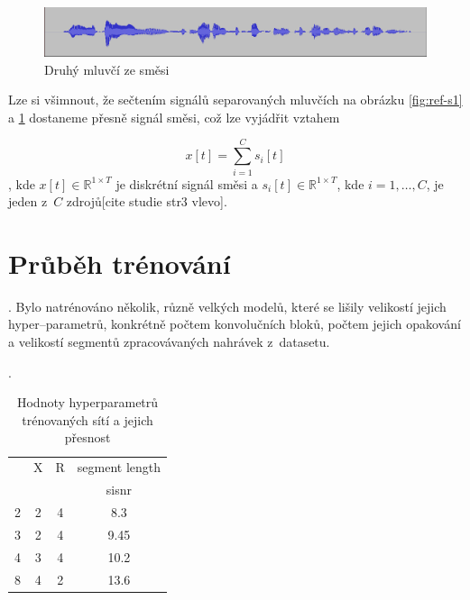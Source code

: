 \begin{figure}[H]
    \centering
    \includegraphics[scale=0.35]{obrazky-figures/dataset-s2.png}
    \caption{\label{fig:ref-s2}Druhý mluvčí ze směsi}
\end{figure}

Lze si všimnout, že sečtením signálů separovaných mluvčích na obrázku \ref{fig:ref-s1} a \ref{fig:ref-s2} dostaneme přesně signál směsi, což lze vyjádřit vztahem

\begin{equation}
  x[t] = \sum_{i=1}^C s_i[t]
\end{equation}
, kde $x[t] \in \mathbb{R}^{1 \times T}$ je diskrétní signál směsi a $s_i[t] \in \mathbb{R}^{1 \times T}$, kde $i = 1,\ldots,C$, je jeden z~$C$ zdrojů[cite studie str3 vlevo]. 





\section{Průběh trénování}
.
Bylo natrénováno několik, různě velkých modelů, které se lišily velikostí jejich hyper--parametrů, konkrétně počtem konvolučních bloků, počtem jejich opakování a velikostí segmentů zpracovávaných nahrávek z~datasetu. 

.

\begin{table}[hbt]
\centering
\caption{Hodnoty hyperparametrů trénovaných sítí a jejich přesnost}
\label{hodnoty}
\begin{tabular}{|l|c|c|c|}
\hline
 & X & R & segment length  \\
 &  &  & sisnr  \\ \hline
2 & 2 & 4 & 8.3 \\ \hline
3 & 2 & 4& 9.45 \\ \hline
4 & 3 & 4 & 10.2 \\ \hline
8 & 4 & 2 & 13.6 \\ \hline
\end{tabular}
\end{table}


